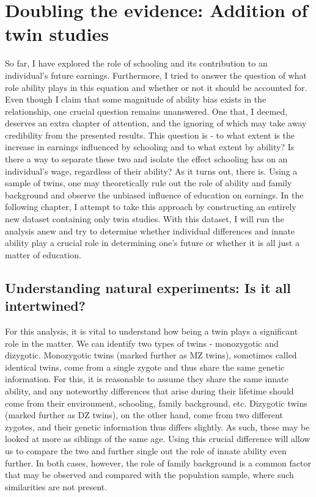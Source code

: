 \chapter{Doubling the evidence: Addition of twin studies}
\label{chap:seven}

So far, I have explored the role of schooling and its contribution to an individual's future earnings. Furthermore, I tried to answer the question of what role ability plays in this equation and whether or not it should be accounted for. 
Even though I claim that some magnitude of ability bias exists in the relationship, one crucial question remains unanswered. One that, I deemed, deserves an extra chapter of attention, and the ignoring of which may take away credibility from the presented results. This question is - to what extent is the increase in earnings influenced by schooling and to what extent by ability? Is there a way to separate these two and isolate the effect schooling has on an individual's wage, regardless of their ability? As it turns out, there is. Using a sample of twins, one may theoretically rule out the role of ability and family background and observe the unbiased influence of education on earnings. In the following chapter, I attempt to take this approach by constructing an entirely new dataset containing only twin studies. With this dataset, I will run the analysis anew and try to determine whether individual differences and innate ability play a crucial role in determining one's future or whether it is all just a matter of education.


\section{Understanding natural experiments: Is it all intertwined?}
\label{sec:twins_literature}

For this analysis, it is vital to understand how being a twin plays a significant role in the matter. We can identify two types of twins - monozygotic and dizygotic. Monozygotic twins (marked further as MZ twins), sometimes called identical twins, come from a single zygote and thus share the same genetic information. For this, it is reasonable to assume they share the same innate ability, and any noteworthy differences that arise during their lifetime should come from their environment, schooling, family background, etc. Dizygotic twins (marked further as DZ twins), on the other hand, come from two different zygotes, and their genetic information thus differs slightly. As such, these may be looked at more as siblings of the same age. Using this crucial difference will allow us to compare the two and further single out the role of innate ability even further. In both cases, however, the role of family background is a common factor that may be observed and compared with the population sample, where such similarities are not present.

